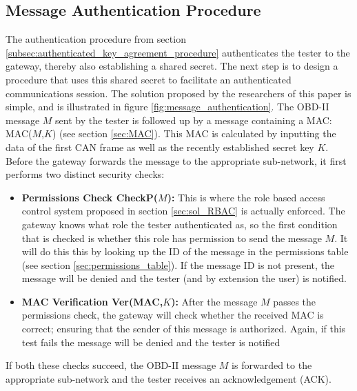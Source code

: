 \subsection{Message Authentication Procedure}
\label{subsec:message_authentication_procedure}

The authentication procedure from section \ref{subsec:authenticated_key_agreement_procedure} authenticates the tester to the gateway, thereby also establishing a shared secret. The next step is to design a procedure that uses this shared secret to facilitate an authenticated communications session. The solution proposed by the researchers of this paper is simple, and is illustrated in figure \ref{fig:message_authentication}. The OBD-II message $M$ sent by the tester is followed up by a message containing a MAC: MAC($M$,$K$) (see section \ref{sec:MAC}). This MAC is calculated by inputting the data of the first CAN frame as well as the recently established secret key $K$. Before the gateway forwards the message to the appropriate sub-network, it first performs two distinct security checks: 
\begin{itemize}
	\item \textbf{Permissions Check CheckP($M$):} This is where the role based access control system proposed in section \ref{sec:sol_RBAC} is actually enforced. The gateway knows what role the tester authenticated as, so the first condition that is checked is whether this role has permission to send the message $M$. It will do this this by looking up the ID of the message in the permissions table (see section \ref{sec:permissions_table}). If the message ID is not present, the message will be denied and the tester (and by extension the user) is notified.
	
	\item \textbf{MAC Verification Ver(MAC,$K$):} After the message $M$ passes the permissions check, the gateway will check whether the received MAC is correct; ensuring that the sender of this message is authorized. Again, if this test fails the message will be denied and the tester is notified
\end{itemize}
If both these checks succeed, the OBD-II message $M$ is forwarded to the appropriate sub-network and the tester receives an acknowledgement (ACK). 

